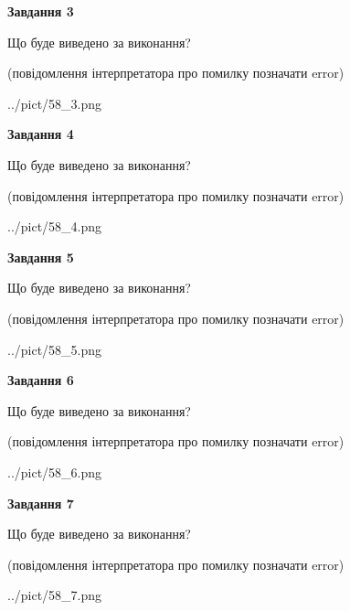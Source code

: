 \documentclass[12pt, ukrainian]{article}
\begin{document}
{\begin {large}
{\begin {center}\textbf{Завдання 3}\end {center}}\par
Що буде виведено за виконання?\par
 (повідомлення інтерпретатора про помилку позначати error)\par
\begin{center}
	{../pict/58_3.png}
\end{center}
\newpage

{\begin {center}\textbf{Завдання 4}\end {center}}\par
Що буде виведено за виконання?\par
 (повідомлення інтерпретатора про помилку позначати error)\par
\begin{center}
	{../pict/58_4.png}
\end{center}
\newpage

{\begin {center}\textbf{Завдання 5}\end {center}}\par
Що буде виведено за виконання?\par
 (повідомлення інтерпретатора про помилку позначати error)\par
\begin{center}
	{../pict/58_5.png}
\end{center}
\newpage

{\begin {center}\textbf{Завдання 6}\end {center}}\par
Що буде виведено за виконання?\par
 (повідомлення інтерпретатора про помилку позначати error)\par
\begin{center}
	{../pict/58_6.png}
\end{center}
\newpage

{\begin {center}\textbf{Завдання 7}\end {center}}\par
Що буде виведено за виконання?\par
 (повідомлення інтерпретатора про помилку позначати error)\par
\begin{center}
	{../pict/58_7.png}
\end{center}
\newpage


\end{large}}
\end{document}
